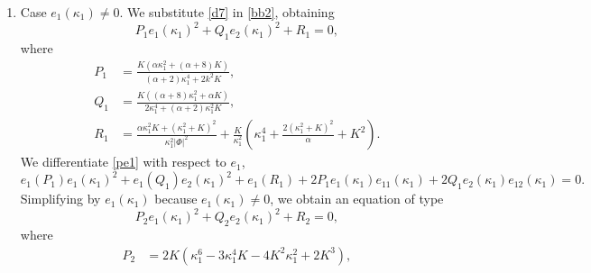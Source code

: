 \documentclass[a4paper,12pt]{amsart}
\theoremstyle{definition}
\begin{document}
\begin{enumerate}
\begin{equation}
\end{equation}
Notice that we are using $K\not=0$. Differentiating with respect to $e_2$ and because $e_2(|\Phi|^2)=2\mu$, we obtain after some manipulations together the expression of $e_2(\kappa_1)^2$ given in \eqref{E1}, a polynomial on $\kappa_1$ of degree $10$ with constant coefficients, namely,  
\begin{equation*}
\begin{split}
0&=- (\alpha +5) \kappa_1^{10} +(2 \alpha  (\alpha +9)+37) K\kappa_1^8 +2 (\alpha  (\alpha  (\alpha +13)+47)+47) K^2\kappa_1^6 \\
&+2 (\alpha  (\alpha  (\alpha +6)+14)+29) K^3\kappa_1^4 -(\alpha +1) (\alpha  (\alpha +4)-7) K^4\kappa_1^2 \\
&+(\alpha +1)^2 K^5.
\end{split}
\end{equation*}
Since the coefficients of this polynomial cannot vanish mutually, this implies that $\kappa_1$ is a constant, obtaining a contradiction.
 \item Case $e_1(\kappa_1)\not=0$.
 We substitute \eqref{d7} in \eqref{bb2}, obtaining
\begin{equation}\label{pe1}
P_1e_1(\kappa_1)^2+Q_1e_2(\kappa_1)^2+R_1=0,
\end{equation}
where
\begin{equation*}
\begin{split}
P_1&=\frac{K \left(\alpha  \kappa_1^2+(\alpha +8) K\right)}{(\alpha +2) \kappa_1^4+2 k^2 K},\\
Q_1&=\frac{K \left((\alpha +8) \kappa_1^2+\alpha  K\right)}{2 \kappa_1^4+(\alpha +2) \kappa_1^2 K},\\
R_1&=  \frac{\alpha  \kappa_1^2 K+\left(\kappa_1^2+K\right)^2}{\kappa_1^2|\Phi|^2}+\frac{K}{\kappa_1^2} \left(\kappa_1^4+\frac{2 \left(\kappa_1^2+K\right)^2}{\alpha }+K^2\right) .
\end{split}
\end{equation*}
We differentiate \eqref{pe1} with respect to $e_1$, 
$$e_1(P_1)e_1(\kappa_1)^2+e_1(Q_1)e_2(\kappa_1)^2+e_1(R_1)+2P_1e_1(\kappa_1)e_{11}(\kappa_1)+2Q_1 e_2(\kappa_1)e_{12}(\kappa_1)=0.$$
Simplifying by $e_1(\kappa_1)$ because $e_1(\kappa_1)\not=0$, we obtain an equation of type
\begin{equation}\label{pe2}
P_2e_1(\kappa_1)^2+Q_2e_2(\kappa_1)^2+R_2=0,
\end{equation}
where
\begin{equation*}
\begin{split}
P_2&=2K(\kappa_1^6-3\kappa_1^4 K-4K^2\kappa_1^2+2K^3 ),\\

\end{split}
\end{equation*}
\end{enumerate}
\end{document}

